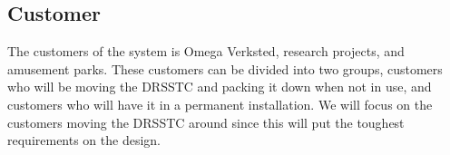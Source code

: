 \subsection{Customer}
The customers of the system is Omega Verksted, research projects, and amusement parks. These customers can be divided into two groups, customers who will be moving the DRSSTC and packing it down when not in use, and customers who will have it in a permanent installation. We will focus on the customers moving the DRSSTC around since this will put the toughest requirements on the design.